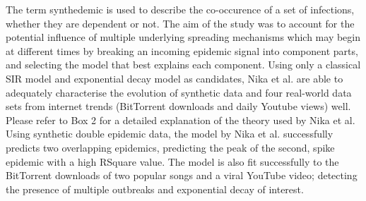 The term synthedemic is used to describe the co-occurence of a set of
infections, whether they are dependent or not. The aim of the study
was to account for the potential influence of multiple underlying
spreading mechanisms which may begin at different times by breaking an
incoming epidemic signal into component parts, and selecting the model
that best explains each component. Using only a classical SIR model
and exponential decay model as candidates, Nika et al. are able to
adequately characterise the evolution of synthetic data and four
real-world data sets from internet trends (BitTorrent downloads and
daily Youtube views) well. Please refer to Box 2 for a detailed
explanation of the theory used by Nika et al. Using synthetic double
epidemic data, the model by Nika et al. successfully predicts two
overlapping epidemics, predicting the peak of the second, spike
epidemic with a high RSquare value. The model is also fit successfully
to the BitTorrent downloads of two popular songs and a viral YouTube
video; detecting the presence of multiple outbreaks and exponential
decay of interest.
\newpage
